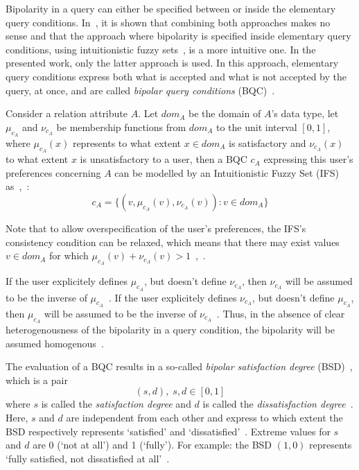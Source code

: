 \documentclass[runningheads,a4paper]{llncs}
\begin{document}
Bipolarity in a query can either be specified between or inside the elementary query conditions. In~\cite{Matthe2011ijis}, it is shown that combining both approaches makes no sense and that the approach where bipolarity is specified inside elementary query conditions, using intuitionistic fuzzy sets~\cite{Atanassov1986fss}, is a more intuitive one. In the presented work, only the latter approach is used. In this approach, elementary query conditions express both what is accepted and what is not accepted by the query, at once, and are called \emph{bipolar query conditions} (BQC)~\cite{Matthe2011ijis}.

Consider a relation attribute $A$. Let $dom_{A}$ be the domain of $A$'s data type, let $\mu_{c_{A}}$ and $\nu_{c_{A}}$ be membership functions from $dom_{A}$ to the unit interval $\left[0, 1\right]$, where $\mu_{c_{A}}(x)$ represents to what extent $x \in dom_{A}$ is satisfactory and $\nu_{c_{A}}(x)$ to what extent $x$ is unsatisfactory to a user, then a BQC $c_{A}$ expressing this user's preferences concerning $A$ can be modelled by an Intuitionistic Fuzzy Set (IFS)~\cite{Atanassov1986fss} as~\cite{Matthe2011ijis},~\cite{DeTre2010ieeetfs}:
\vspace{-5pt}
\begin{equation}
c_{A} = \{(v, \mu_{c_{A}}(v), \nu_{c_{A}}(v)) : v \in dom_{A}\}
\end{equation}

Note that to allow overspecification of the user's preferences, the IFS's consistency condition can be relaxed, which means that there may exist values $v \in dom_{A}$ for which $\mu_{c_{A}}(v) + \nu_{c_{A}}(v) > 1$~\cite{Matthe2011ijis},~\cite{DeTre2010ieeetfs}.

If the user explicitely defines $\mu_{c_{A}}$, but doesn't define $\nu_{c_{A}}$, then $\nu_{c_{A}}$ will be assumed to be the inverse of $\mu_{c_{A}}$~\cite{Matthe2011ijis}. If the user explicitely defines $\nu_{c_{A}}$, but doesn't define $\mu_{c_{A}}$, then $\mu_{c_{A}}$ will be assumed to be the inverse of $\nu_{c_{A}}$~\cite{Matthe2011ijis}. Thus, in the absence of clear heterogenousness of the bipolarity in a query condition, the bipolarity will be assumed homogenous~\cite{Matthe2011ijis}.

The evaluation of a BQC results in a so-called {\em bipolar satisfaction degree} (BSD)~\cite{Matthe2011ijis}, which is a pair
\vspace{-10pt}
\begin{equation}
(s,d),\; s,d \in [0,1] \nonumber
\end{equation}
where $s$ is called the \emph{satisfaction degree} and $d$ is called the \emph{dissatisfaction degree}~\cite{Matthe2011ijis}. Here, $s$ and $d$ are independent from each other and express to which extent the BSD respectively represents `satisfied' and `dissatisfied'~\cite{Matthe2011ijis}. Extreme values for $s$ and $d$ are 0 (`not at all') and 1 (`fully'). For example: the BSD $(1,0)$ represents `fully satisfied, not dissatisfied at all'~\cite{Matthe2011ijis}.
\end{document}
